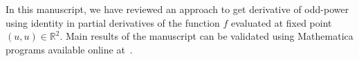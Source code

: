 In this manuscript, we have reviewed an approach to get derivative of odd-power using identity in partial derivatives
of the function $f$ evaluated at fixed point $(u,u) \in \mathbb{R}^2.$
Main results of the manuscript can be validated using Mathematica programs available online at~\cite{kolosov2022another}.